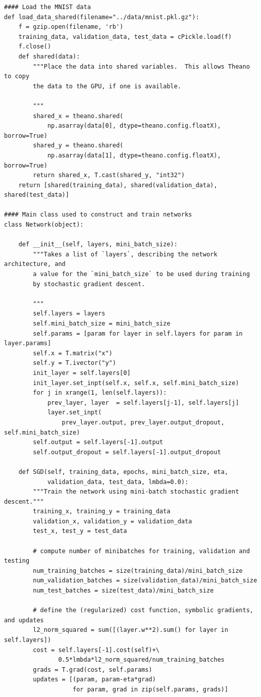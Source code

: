 \begin{lstlisting}
#### Load the MNIST data
def load_data_shared(filename="../data/mnist.pkl.gz"):
    f = gzip.open(filename, 'rb')
    training_data, validation_data, test_data = cPickle.load(f)
    f.close()
    def shared(data):
        """Place the data into shared variables.  This allows Theano to copy
        the data to the GPU, if one is available.

        """
        shared_x = theano.shared(
            np.asarray(data[0], dtype=theano.config.floatX), borrow=True)
        shared_y = theano.shared(
            np.asarray(data[1], dtype=theano.config.floatX), borrow=True)
        return shared_x, T.cast(shared_y, "int32")
    return [shared(training_data), shared(validation_data), shared(test_data)]

#### Main class used to construct and train networks
class Network(object):

    def __init__(self, layers, mini_batch_size):
        """Takes a list of `layers`, describing the network architecture, and
        a value for the `mini_batch_size` to be used during training
        by stochastic gradient descent.

        """
        self.layers = layers
        self.mini_batch_size = mini_batch_size
        self.params = [param for layer in self.layers for param in layer.params]
        self.x = T.matrix("x")
        self.y = T.ivector("y")
        init_layer = self.layers[0]
        init_layer.set_inpt(self.x, self.x, self.mini_batch_size)
        for j in xrange(1, len(self.layers)):
            prev_layer, layer  = self.layers[j-1], self.layers[j]
            layer.set_inpt(
                prev_layer.output, prev_layer.output_dropout, self.mini_batch_size)
        self.output = self.layers[-1].output
        self.output_dropout = self.layers[-1].output_dropout

    def SGD(self, training_data, epochs, mini_batch_size, eta,
            validation_data, test_data, lmbda=0.0):
        """Train the network using mini-batch stochastic gradient descent."""
        training_x, training_y = training_data
        validation_x, validation_y = validation_data
        test_x, test_y = test_data

        # compute number of minibatches for training, validation and testing
        num_training_batches = size(training_data)/mini_batch_size
        num_validation_batches = size(validation_data)/mini_batch_size
        num_test_batches = size(test_data)/mini_batch_size

        # define the (regularized) cost function, symbolic gradients, and updates
        l2_norm_squared = sum([(layer.w**2).sum() for layer in self.layers])
        cost = self.layers[-1].cost(self)+\
               0.5*lmbda*l2_norm_squared/num_training_batches
        grads = T.grad(cost, self.params)
        updates = [(param, param-eta*grad)
                   for param, grad in zip(self.params, grads)]


\end{lstlisting}
